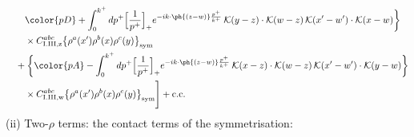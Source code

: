 \begin{align}
&\qquad{\color{pD}+\int_{0}^{k^{+}}dp^{+}\Big[\frac{1}{p^{+}}\Big]_{+}e^{-ik\cdot\ph{(z-w)}\frac{p^{+}}{k^{+}}}\,\mathcal{K}(y-z)\cdot\mathcal{K}(w-z)\,\mathcal{K}(x'-w')\cdot\mathcal{K}(x-w)}\bigg\}\notag\\
&\qquad\times C^{abc}_{{\rm I.III,z}}\big\{\rho^{a}(x')\rho^{b}(x)\rho^{c}(y)\big\}_{\rm sym}\notag\\
&\quad+\bigg\{{\color{pA}-\int_{0}^{k^{+}}dp^{+}\Big[\frac{1}{p^{+}}\Big]_{+}e^{-ik\cdot\ph{(z-w)}\frac{p^{+}}{k^{+}}}\,\mathcal{K}(x-z)\cdot\mathcal{K}(w-z)\,\mathcal{K}(x'-w')\cdot\mathcal{K}(y-w)}\bigg\}\notag\\
&\qquad\times C^{abc}_{{\rm I.III,w}}\big\{\rho^{a}(x')\rho^{b}(x)\rho^{c}(y)\big\}_{\rm sym}\Bigg]+{\rm c.c.}\label{eq:D-I.III-3}
\end{align}
(ii) Two-$\rho$ terms: the contact terms of the symmetrisation:
